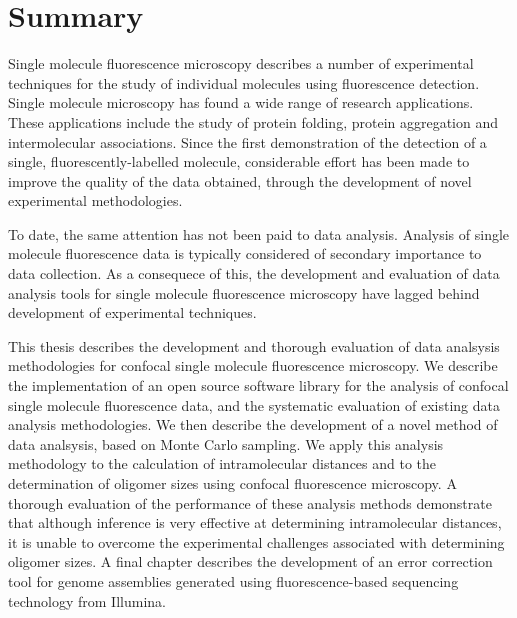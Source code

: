 \chapter*{Summary}
Single molecule fluorescence microscopy describes a number of experimental techniques for the study of individual molecules using fluorescence detection. Single molecule microscopy has found a wide range of research applications. These applications include the study of protein folding, protein aggregation and intermolecular associations. Since the first demonstration of the detection of a single, fluorescently-labelled molecule, considerable effort has been made to improve the quality of the data obtained, through the development of novel experimental methodologies.

To date, the same attention has not been paid to data analysis. Analysis of single molecule fluorescence data is typically considered of secondary importance to data collection. As a consequece of this, the development and evaluation of data analysis tools for single molecule fluorescence microscopy have lagged behind development of experimental techniques. 

This thesis describes the development and thorough evaluation of data analsysis methodologies for confocal single molecule fluorescence microscopy. We describe the implementation of an open source software library for the analysis of confocal single molecule fluorescence data, and the systematic evaluation of existing data analysis methodologies. We then describe the development of a novel method of data analsysis, based on Monte Carlo sampling. We apply this analysis methodology to the calculation of intramolecular distances and to the determination of oligomer sizes using confocal fluorescence microscopy. A thorough evaluation of the performance of these analysis methods demonstrate that although inference is very effective at determining intramolecular distances, it is unable to overcome the experimental challenges associated with determining oligomer sizes. A final chapter describes the development of an error correction tool for genome assemblies generated using fluorescence-based sequencing technology from Illumina.

